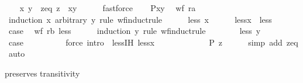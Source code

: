 \begin{isabellebody}
\ \ \isamarkupfalse%
\ x\ y\ \ zeq{\isacharcolon}{\kern0pt}\ {\isachardoublequoteopen}z\ {\isacharequal}{\kern0pt}\ {\isacharparenleft}{\kern0pt}x{\isacharcomma}{\kern0pt}y{\isacharparenright}{\kern0pt}{\isachardoublequoteclose}\isanewline
\ \ \ \ \isamarkupfalse%
\ fastforce\isanewline
\ \ \isamarkupfalse%
\ {\isachardoublequoteopen}P{\isacharparenleft}{\kern0pt}x{\isacharcomma}{\kern0pt}y{\isacharparenright}{\kern0pt}{\isachardoublequoteclose}\ \isamarkupfalse%
\ {\isacartoucheopen}wf\ ra{\isacartoucheclose}\isanewline
\ \ \isamarkupfalse%
\ {\isacharparenleft}{\kern0pt}induction\ x\ arbitrary{\isacharcolon}{\kern0pt}\ y\ rule{\isacharcolon}{\kern0pt}\ wf{\isacharunderscore}{\kern0pt}induct{\isacharunderscore}{\kern0pt}rule{\isacharparenright}{\kern0pt}\isanewline
\ \ \ \ \isamarkupfalse%
\ {\isacharparenleft}{\kern0pt}less\ x{\isacharparenright}{\kern0pt}\isanewline
\ \ \ \ \isamarkupfalse%
\ lessx\ {\isacharequal}{\kern0pt}\ less\isanewline
\ \ \ \ \isamarkupfalse%
\ {\isacharquery}{\kern0pt}case\ \isamarkupfalse%
\ {\isacartoucheopen}wf\ rb{\isacartoucheclose}\ less\isanewline
\ \ \ \ \isamarkupfalse%
\ {\isacharparenleft}{\kern0pt}induction\ y\ rule{\isacharcolon}{\kern0pt}\ wf{\isacharunderscore}{\kern0pt}induct{\isacharunderscore}{\kern0pt}rule{\isacharparenright}{\kern0pt}\isanewline
\ \ \ \ \ \ \isamarkupfalse%
\ {\isacharparenleft}{\kern0pt}less\ y{\isacharparenright}{\kern0pt}\isanewline
\ \ \ \ \ \ \isamarkupfalse%
\ {\isacharquery}{\kern0pt}case\isanewline
\ \ \ \ \ \ \ \ \isamarkupfalse%
\ {\isacharparenleft}{\kern0pt}force\ intro{\isacharcolon}{\kern0pt}\ {\isacharasterisk}{\kern0pt}\ less{\isachardot}{\kern0pt}IH\ lessx{\isacharparenright}{\kern0pt}\isanewline
\ \ \ \ \isamarkupfalse%
\isanewline
\ \ \isamarkupfalse%
\isanewline
\ \ \isamarkupfalse%
\ \isamarkupfalse%
\ {\isachardoublequoteopen}P\ z{\isachardoublequoteclose}\isanewline
\ \ \ \ \isamarkupfalse%
\ {\isacharparenleft}{\kern0pt}simp\ add{\isacharcolon}{\kern0pt}\ zeq{\isacharparenright}{\kern0pt}\isanewline
{}\isamarkupfalse%
\ auto%
\endisatagproof
{\isafoldproof}%
%
\isadelimproof
%
\endisadelimproof
%
\begin{isamarkuptext}%
 preserves transitivity%

\end{isamarkuptext}
\end{isabellebody}
